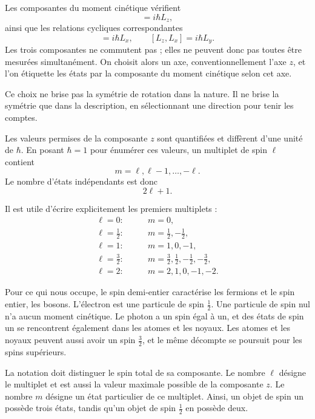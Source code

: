 Les composantes du moment cinétique vérifient
\begin{equation}
[L_x,L_y]=i\hbar L_z,
\end{equation}
ainsi que les relations cycliques correspondantes
\begin{equation}
[L_y,L_z]=i\hbar L_x,
\qquad
[L_z,L_x]=i\hbar L_y.
\end{equation}
Les trois composantes ne commutent pas ; elles ne peuvent donc pas toutes être mesurées simultanément. On choisit alors un axe, conventionnellement l’axe \(z\), et l’on étiquette les états par la composante du moment cinétique selon cet axe.

Ce choix ne brise pas la symétrie de rotation dans la nature. Il ne brise la symétrie que dans la description, en sélectionnant une direction pour tenir les comptes.

Les valeurs permises de la composante \(z\) sont quantifiées et diffèrent d’une unité de \(\hbar\). En posant \(\hbar=1\) pour énumérer ces valeurs, un multiplet de spin \(\ell\) contient
\begin{equation}
m=\ell,\ell-1,\ldots,-\ell.
\end{equation}
Le nombre d’états indépendants est donc
\begin{equation}
2\ell+1.
\end{equation}

Il est utile d’écrire explicitement les premiers multiplets :
\begin{align}
\ell=0:&\qquad m=0,\\
\ell=\frac12:&\qquad m=\frac12,-\frac12,\\
\ell=1:&\qquad m=1,0,-1,\\
\ell=\frac32:&\qquad
m=\frac32,\frac12,-\frac12,-\frac32,\\
\ell=2:&\qquad m=2,1,0,-1,-2.
\end{align}

Pour ce qui nous occupe, le spin demi-entier caractérise les fermions et le spin entier, les bosons. L’électron est une particule de spin \(\tfrac12\). Une particule de spin nul n’a aucun moment cinétique. Le photon a un spin égal à un, et des états de spin un se rencontrent également dans les atomes et les noyaux. Les atomes et les noyaux peuvent aussi avoir un spin \(\tfrac32\), et le même décompte se poursuit pour les spins supérieurs.

La notation doit distinguer le spin total de sa composante. Le nombre \(\ell\) désigne le multiplet et est aussi la valeur maximale possible de la composante \(z\). Le nombre \(m\) désigne un état particulier de ce multiplet. Ainsi, un objet de spin un possède trois états, tandis qu’un objet de spin \(\tfrac12\) en possède deux.

